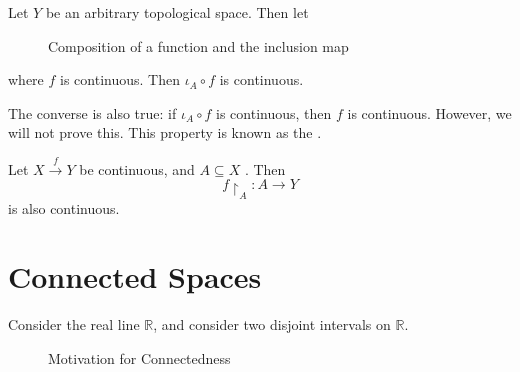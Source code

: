 \documentclass[notoc,notitlepage]{tufte-book}
\begin{document}
Let $Y$ be an arbitrary topological space. Then let

\begin{figure}[ht]
  \centering
  \caption{Composition of a function and the inclusion map}
  \label{fig:composition_of_a_function_and_the_inclusion_map}
\end{figure}

where $f$ is continuous. Then $\iota_A \circ f$ is continuous.

The converse is also true: if $\iota_A \circ f$ is continuous, then $f$ is continuous.
However, we will not prove this. This property is known as the
.

\begin{lemma}\label{lemma:restriction_of_a_continuous_map_is_continuous}
  Let $X \overset{f}{\to} Y$ be continuous, and $A \subseteq X$
  . Then
  \begin{equation*}
    f \restriction_{A} : A \to Y
  \end{equation*}
  is also continuous.
\end{lemma}


\section{Connected Spaces}%
\label{sec:connected_spaces}

Consider the real line $\mathbb{R}$, and consider two disjoint intervals on $\mathbb{R}$.

\begin{figure}[ht]
  \centering
  \caption{Motivation for Connectedness}
  \label{fig:motivation_for_connectedness}
\end{figure}
\end{document}
